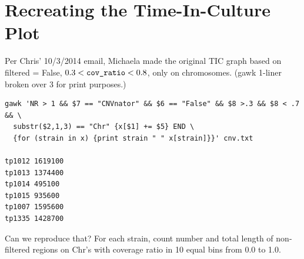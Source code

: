 \documentclass{article}\usepackage[]{graphicx}\usepackage[]{color}
\begin{document}
\section{Recreating the Time-In-Culture Plot}

Per Chris' 10/3/2014 email, Michaela made the original TIC graph based on filtered = False, $0.3 < \verb|cov_ratio| < 0.8$, only on chromosomes. (gawk 1-liner broken over 3 for print purposes.)
{\small
\begin{verbatim}
gawk 'NR > 1 && $7 == "CNVnator" && $6 == "False" && $8 >.3 && $8 < .7 && \
  substr($2,1,3) == "Chr" {x[$1] += $5} END \
  {for (strain in x) {print strain " " x[strain]}}' cnv.txt

tp1012 1619100
tp1013 1374400
tp1014 495100
tp1015 935600
tp1007 1595600
tp1335 1428700
\end{verbatim}
}%

Can we reproduce that? For each strain, count number and total length of non-filtered regions on Chr's with coverage ratio in 10 equal bins from 0.0 to 1.0.
\end{document}
